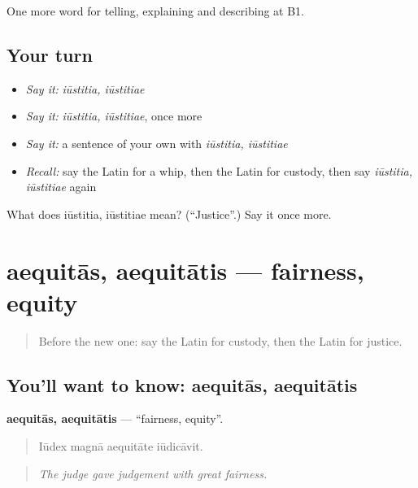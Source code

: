 \begin{grammarlens}[title={What you've built}]
One more word for telling, explaining and describing at B1.
\end{grammarlens}

\subsection*{Your turn}
\begin{itemize}
\raggedright
  \item \emph{Say it:} \emph{iūstitia, iūstitiae}
  \item \emph{Say it:} \emph{iūstitia, iūstitiae}, once more
  \item \emph{Say it:} a sentence of your own with \emph{iūstitia, iūstitiae}
  \item \emph{Recall:} say the Latin for a whip, then the Latin for custody, then say \emph{iūstitia, iūstitiae} again
\end{itemize}

\begin{tcolorbox}[breakable,colback=teal!4,colframe=teal!35!black,title={Before you move on}]
What does iūstitia, iūstitiae mean? (\textquotedblleft{}Justice\textquotedblright{}.) Say it once more.
\end{tcolorbox}
\section[aequitās, aequitātis]{aequitās, aequitātis — fairness, equity}

\label{lesson:LA-C416-aequitas}



\begin{quote}
Before the new one: say the Latin for custody, then the Latin for justice.
\end{quote}

\subsection*{You'll want to know: aequitās, aequitātis}
\textbf{aequitās, aequitātis} — \textquotedblleft{}fairness, equity\textquotedblright{}.

\begin{quote}
Iūdex magnā aequitāte iūdicāvit.
\end{quote}

\begin{quote}
\emph{The judge gave judgement with great fairness.}
\end{quote}

